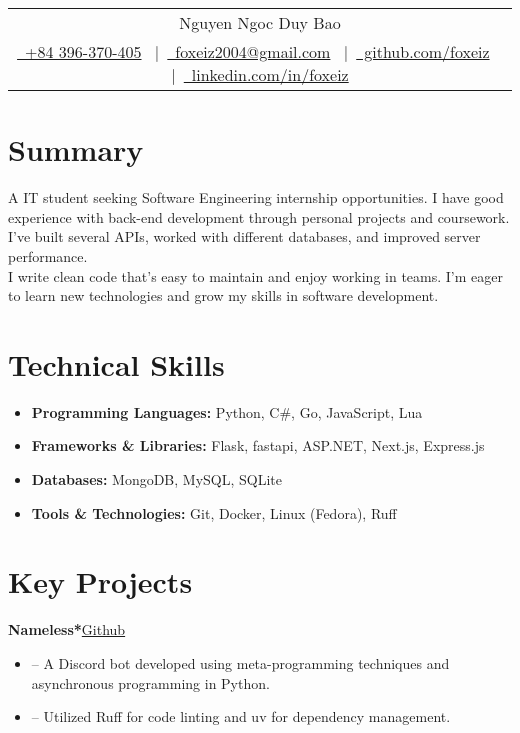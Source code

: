 \documentclass[a4paper,12pt]{article}
\newenvironment{itemList}[3][]
    {
    \noindent\hspace{1em}\textbf{#2}\hfill#3\\[3.75pt]
    \begin{minipage}[t]{\linewidth}
    \begin{itemize}[nosep,after=\strut, leftmargin=2em, itemsep=3pt,label={},#1]
    }
    {
    \end{itemize}
    \end{minipage}
    }
\begin{document}
\pagestyle{empty}

\begin{tabularx}{\linewidth}{@{} C @{}}
    \Huge{Nguyen Ngoc Duy Bao} \\[7.5pt]
    \href{tel:+84396370405}{\raisebox{-0.05\height}\ +84 396-370-405} \ $|$\
    \href{mailto:foxeiz2004@gmail.com}{\raisebox{-0.05\height}\ foxeiz2004@gmail.com} \ $|$\
    \href{https://github.com/foxeiz}{\raisebox{-0.05\height}\ github.com/foxeiz} \ $|$\
    \href{https://linkedin.com/in/foxeiz}{\raisebox{-0.05\height}\ linkedin.com/in/foxeiz}
\end{tabularx}

\section{Summary}
A IT student seeking Software Engineering internship opportunities. I have good experience with back-end development through personal projects and coursework. I've built several APIs, worked with different databases, and improved server performance. \\
I write clean code that's easy to maintain and enjoy working in teams. I'm eager to learn new technologies and grow my skills in software development.

\section{Technical Skills}
\begin{itemize}[nosep,after=\strut, leftmargin=1em, itemsep=4pt, label={}]
    \item \textbf{Programming Languages:} Python, C\#, Go, JavaScript, Lua
    \item \textbf{Frameworks \& Libraries:} Flask, fastapi, ASP.NET, Next.js, Express.js
    \item \textbf{Databases:} MongoDB, MySQL, SQLite
    \item \textbf{Tools \& Technologies:} Git, Docker, Linux (Fedora), Ruff
\end{itemize}

\section{Key Projects}

\begin{itemList}{Nameless*}{\href{https://github.com/team-nameless/nameless-discord-bot/}{Github}}
    \item -- A Discord bot developed using meta-programming techniques and asynchronous programming in Python.
    \item -- Utilized Ruff for code linting and uv for dependency management.
\end{itemList}
\end{document}
